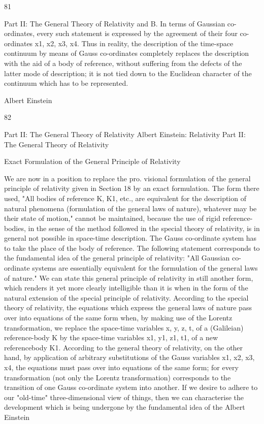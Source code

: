 \documentclass{article}
\begin{document}
81

Part II: The General Theory of Relativity
and B. In terms of Gaussian co-ordinates, every such statement is expressed by the
agreement of their four co-ordinates x1, x2, x3, x4. Thus in reality, the description of the
time-space continuum by means of Gauss co-ordinates completely replaces the description
with the aid of a body of reference, without suffering from the defects of the latter mode of
description; it is not tied down to the Euclidean character of the continuum which has to be
represented.

Albert Einstein

82

Part II: The General Theory of Relativity
Albert Einstein: Relativity
Part II: The General Theory of Relativity

Exact Formulation of the General
Principle of Relativity

We are now in a position to replace the pro. visional formulation of the general principle
of relativity given in Section 18 by an exact formulation. The form there used, "All bodies
of reference K, K1, etc., are equivalent for the description of natural phenomena
(formulation of the general laws of nature), whatever may be their state of motion," cannot
be maintained, because the use of rigid reference-bodies, in the sense of the method
followed in the special theory of relativity, is in general not possible in space-time
description. The Gauss co-ordinate system has to take the place of the body of reference.
The following statement corresponds to the fundamental idea of the general principle of
relativity: "All Gaussian co-ordinate systems are essentially equivalent for the formulation
of the general laws of nature."
We can state this general principle of relativity in still another form, which renders it yet
more clearly intelligible than it is when in the form of the natural extension of the special
principle of relativity. According to the special theory of relativity, the equations which
express the general laws of nature pass over into equations of the same form when, by
making use of the Lorentz transformation, we replace the space-time variables x, y, z, t, of a
(Galileian) reference-body K by the space-time variables x1, y1, z1, t1, of a new referencebody K1. According to the general theory of relativity, on the other hand, by application of
arbitrary substitutions of the Gauss variables x1, x2, x3, x4, the equations must pass over into
equations of the same form; for every transformation (not only the Lorentz transformation)
corresponds to the transition of one Gauss co-ordinate system into another.
If we desire to adhere to our "old-time" three-dimensional view of things, then we can
characterise the development which is being undergone by the fundamental idea of the
Albert Einstein
\end{document}
